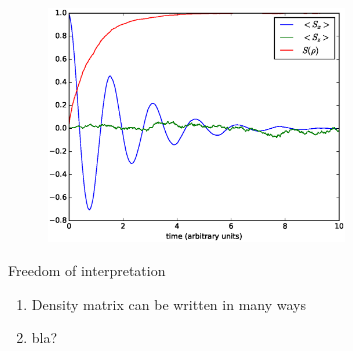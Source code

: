 \documentclass{beamer}
\begin{document}
\begin{frame}
	\begin{figure}[h]
		\centering
		\includegraphics[width=0.7\textwidth]{figs/equal_bitflip_1000.eps}
	\end{figure}
\end{frame}
\begin{frame}{Freedom of interpretation}
	\begin{enumerate}
		\item Density matrix can be written in many ways
		\item bla?
	\end{enumerate}
\end{frame}
\end{document}
